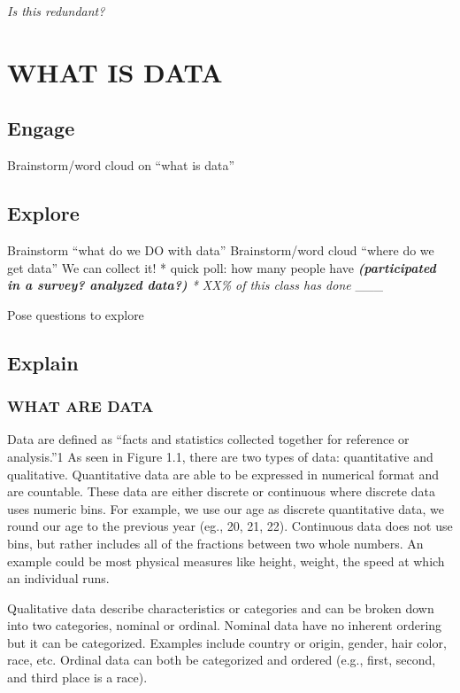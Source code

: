 \documentclass[
]{book}
\begin{document}
\emph{Is this redundant?}

\hypertarget{unit1_ch1}{%
\chapter{WHAT IS DATA}\label{unit1_ch1}}

\hypertarget{engage}{%
\section{Engage}\label{engage}}

Brainstorm/word cloud on ``what is data''

\hypertarget{explore}{%
\section{Explore}\label{explore}}

Brainstorm ``what do we DO with data''
Brainstorm/word cloud ``where do we get data''
We can collect it!
* quick poll: how many people have \emph{\textbf{(participated in a survey? analyzed data?)}
* XX\% of this class has done }\_\_\_

Pose questions to explore

\hypertarget{explain}{%
\section{Explain}\label{explain}}

\hypertarget{what-are-data}{%
\subsection{WHAT ARE DATA}\label{what-are-data}}

Data are defined as ``facts and statistics collected together for reference or analysis.''1 As seen in Figure 1.1, there are two types of data: quantitative and qualitative. Quantitative data are able to be expressed in numerical format and are countable. These data are either discrete or continuous where discrete data uses numeric bins. For example, we use our age as discrete quantitative data, we round our age to the previous year (eg., 20, 21, 22). Continuous data does not use bins, but rather includes all of the fractions between two whole numbers. An example could be most physical measures like height, weight, the speed at which an individual runs.

Qualitative data describe characteristics or categories and can be broken down into two categories, nominal or ordinal. Nominal data have no inherent ordering but it can be categorized. Examples include country or origin, gender, hair color, race, etc. Ordinal data can both be categorized and ordered (e.g., first, second, and third place is a race).
\end{document}
